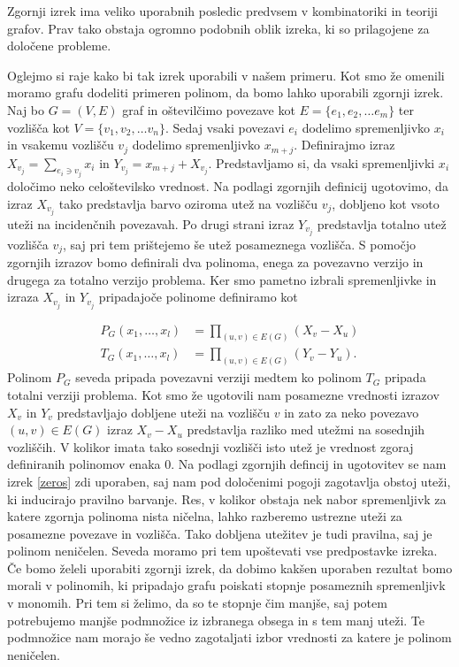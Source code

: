 \documentclass[12pt,a4paper,twoside]{article}
\theoremstyle{definition} %
\theoremstyle{plain} %
\numberwithin{equation}{section}  %
\begin{document}
Zgornji izrek ima veliko uporabnih posledic predvsem v kombinatoriki in teoriji grafov. Prav tako obstaja ogromno podobnih oblik izreka, ki so prilagojene za določene probleme.

Oglejmo si raje kako bi tak izrek uporabili v našem primeru. Kot smo že omenili moramo grafu dodeliti primeren polinom, da bomo lahko uporabili zgornji izrek. Naj bo $G = (V, E)$ graf in oštevilčimo povezave kot $E = \{e_1, e_2, \ldots e_m \}$ ter vozlišča kot $V = \{v_1, v_2, \ldots v_n\}$. Sedaj vsaki povezavi $e_i$ dodelimo spremenljivko $x_i$ in vsakemu vozlišču  $v_j$ dodelimo spremenljivko $x_{m + j}$. Definirajmo izraz $X_{v_j} = \sum_{e_i \ni v_j} x_i$ in $Y_{v_j} = x_{m+j} + X_{v_j}$. Predstavljamo si, da vsaki spremenljivki $x_i$ določimo neko celoštevilsko vrednost. Na podlagi zgornjih definicij ugotovimo, da izraz $X_{v_j}$ tako predstavlja barvo oziroma utež na vozlišču $v_j$, dobljeno kot vsoto uteži na incidenčnih povezavah. Po drugi strani izraz $Y_{v_j}$ predstavlja totalno utež vozlišča $v_j$, saj pri tem prištejemo še utež posameznega vozlišča. S pomočjo zgornjih izrazov bomo definirali dva polinoma, enega za povezavno verzijo in drugega za totalno verzijo problema. Ker smo pametno izbrali spremenljivke in izraza $X_{v_j}$ in $Y_{v_j}$ pripadajoče polinome definiramo kot

\begin{equation*}
\begin{split}
P_{G}(x_1, \ldots, x_l) &= \prod_{(u, v) \in E(G)} \left( X_v- X_u \right) \\
T_{G}(x_1, \ldots, x_l) &= \prod_{(u, v) \in E(G)} \left( Y_v- Y_u \right).
\end{split}
\end{equation*}
Polinom $P_G$ seveda pripada povezavni verziji medtem ko polinom $T_G$ pripada totalni verziji problema. Kot smo že ugotovili nam posamezne vrednosti izrazov $X_v$ in $Y_v$ predstavljajo dobljene uteži na vozlišču $v$ in zato za neko povezavo $(u,v) \in E(G)$ izraz $X_v - X_u$ predstavlja razliko med utežmi na sosednjih vozliščih. V kolikor imata tako sosednji vozlišči isto utež je vrednost zgoraj definiranih polinomov enaka $0$. Na podlagi zgornjih defincij in ugotovitev se nam izrek \ref{zeros} zdi uporaben, saj nam pod določenimi pogoji zagotavlja obstoj uteži, ki inducirajo pravilno barvanje. Res, v kolikor obstaja nek nabor spremenljivk za katere zgornja polinoma nista ničelna, lahko razberemo ustrezne uteži za posamezne povezave in vozlišča. Tako dobljena utežitev je tudi pravilna, saj je polinom neničelen. Seveda moramo pri tem upoštevati vse predpostavke izreka. Če bomo želeli uporabiti zgornji izrek, da dobimo kakšen uporaben rezultat bomo morali v polinomih, ki pripadajo grafu poiskati stopnje posameznih spremenljivk v monomih. Pri tem si želimo, da so te stopnje čim manjše, saj potem potrebujemo manjše podmnožice iz izbranega obsega in s tem manj uteži. Te podmnožice nam morajo še vedno zagotaljati izbor vrednosti za katere je polinom neničelen.
\end{document}
